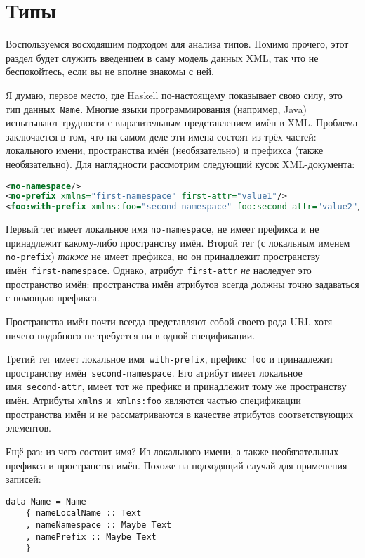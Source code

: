 \section{Типы} %

Воспользуемся восходящим подходом для анализа типов. Помимо прочего, этот
раздел будет служить введением в саму модель данных XML, так что не
беспокойтесь, если вы не вполне знакомы с ней.

Я думаю, первое место, где Haskell по-настоящему показывает свою силу, это тип
данных~\lstinline!Name!. Многие языки программирования (например, Java)
испытывают трудности с выразительным представлением имён в XML. Проблема
заключается в том, что на самом деле эти имена состоят из трёх частей:
локального имени, пространства имён (необязательно) и префикса (также
необязательно). Для наглядности рассмотрим следующий кусок XML-документа:
\begin{lstlisting}[language=XML]
<no-namespace/>
<no-prefix xmlns="first-namespace" first-attr="value1"/>
<foo:with-prefix xmlns:foo="second-namespace" foo:second-attr="value2"/>
\end{lstlisting}

Первый тег имеет локальное имя \lstinline!no-namespace!, не имеет префикса и не
принадлежит какому-либо пространству имён. Второй тег (с локальным именем~%
\lstinline!no-prefix!) \emph{также} не имеет префикса, но он принадлежит
пространству имён~\lstinline!first-namespace!. Однако,
атрибут~\lstinline!first-attr! \emph{не} наследует это пространство имён: пространства
имён атрибутов всегда должны точно задаваться с помощью префикса.

\begin{remark}
    Пространства имён почти всегда представляют собой своего рода URI, хотя
    ничего подобного не требуется ни в одной спецификации.
\end{remark}

Третий тег имеет локальное имя~\lstinline!with-prefix!, префикс~\lstinline!foo!
и принадлежит пространству имён~\lstinline!second-namespace!. Его атрибут имеет
локальное имя~\lstinline!second-attr!, имеет тот же префикс и принадлежит тому
же пространству имён. Атрибуты \lstinline!xmlns! и~\lstinline!xmlns:foo!
являются частью спецификации пространства имён и не рассматриваются в качестве
атрибутов соответствующих элементов.

Ещё раз: из чего состоит имя? Из локального имени, а также необязательных
префикса и пространства имён. Похоже на подходящий случай для применения
записей:
\begin{lstlisting}
data Name = Name
    { nameLocalName :: Text
    , nameNamespace :: Maybe Text
    , namePrefix :: Maybe Text
    }
\end{lstlisting}

